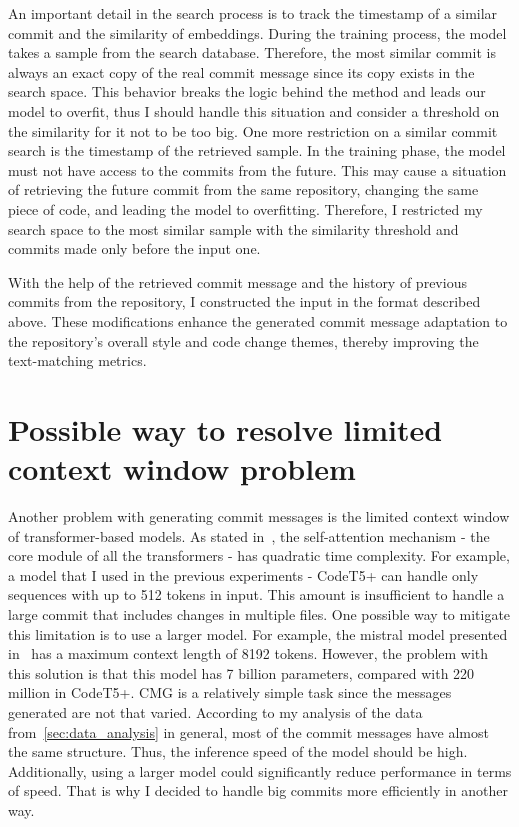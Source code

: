 An important detail in the search process is to track the timestamp of a similar commit and the similarity of embeddings.  During the training process, the model takes a sample from the search database. Therefore, the most similar commit is always an exact copy of the real commit message since its copy exists in the search space. This behavior breaks the logic behind the method and leads our model to overfit, thus I should handle this situation and consider a threshold on the similarity for it not to be too big. One more restriction on a similar commit search is the timestamp of the retrieved sample. In the training phase, the model must not have access to the commits from the future.  This may cause a situation of retrieving the future commit from the same repository, changing the same piece of code, and leading the model to overfitting. Therefore, I restricted my search space to the most similar sample with the similarity threshold and commits made only before the input one.  

With the help of the retrieved commit message and the history of previous commits from the repository, I constructed the input in the format described above. These modifications enhance the generated commit message adaptation to the repository's overall style and code change themes, thereby improving the text-matching metrics.

\section{Possible way to resolve limited context window problem}\label{sec:file_attention_arch}
Another problem with generating commit messages is the limited context window of transformer-based models.  As stated in~\cite{vaswani2017attention}, the self-attention mechanism - the core module of all the transformers {-} has quadratic time complexity. For example, a model that I used in the previous experiments {-} CodeT5+ can handle only sequences with up to 512 tokens in input. This amount is insufficient to handle a large commit that includes changes in multiple files. One possible way to mitigate this limitation is to use a larger model. For example, the mistral model presented in~\cite{jiang2023mistral} has a maximum context length of 8192 tokens. However, the problem with this solution is that this model has 7 billion parameters, compared with 220 million in CodeT5+. 
CMG is a relatively simple task since the messages generated are not that varied. According to my analysis of the data from~\ref{sec:data_analysis} in general, most of the commit messages have almost the same structure.    Thus, the inference speed of the model should be high. Additionally, using a larger model could significantly reduce performance in terms of speed. That is why I decided to handle big commits more efficiently in another way.

